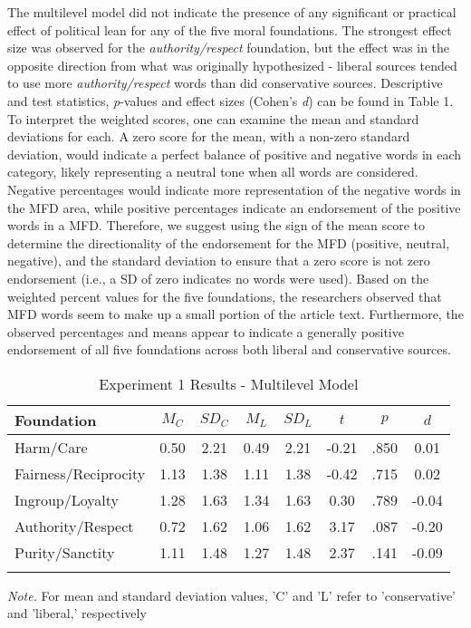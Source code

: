 \documentclass[,man]{apa6}
\begin{document}
The multilevel model did not indicate the presence of any significant or
practical effect of political lean for any of the five moral
foundations. The strongest effect size was observed for the
\emph{authority/respect} foundation, but the effect was in the opposite
direction from what was originally hypothesized - liberal sources tended
to use more \emph{authority/respect} words than did conservative
sources. Descriptive and test statistics, \emph{p}-values and effect
sizes (Cohen's \emph{d}) can be found in Table 1. To interpret the
weighted scores, one can examine the mean and standard deviations for
each. A zero score for the mean, with a non-zero standard deviation,
would indicate a perfect balance of positive and negative words in each
category, likely representing a neutral tone when all words are
considered. Negative percentages would indicate more representation of
the negative words in the MFD area, while positive percentages indicate
an endorsement of the positive words in a MFD. Therefore, we suggest
using the sign of the mean score to determine the directionality of the
endorsement for the MFD (positive, neutral, negative), and the standard
deviation to ensure that a zero score is not zero endorsement (i.e., a
SD of zero indicates no words were used). Based on the weighted percent
values for the five foundations, the researchers observed that MFD words
seem to make up a small portion of the article text. Furthermore, the
observed percentages and means appear to indicate a generally positive
endorsement of all five foundations across both liberal and conservative
sources.

\begin{table}[tbp]
\begin{center}
\begin{threeparttable}
\caption{\label{tab:exp1-table}Experiment 1 Results - Multilevel Model}
\begin{tabular}{lccccccc}
\toprule
Foundation & $M_C$ & $SD_C$ & $M_L$ & $SD_L$ & $t$ & $p$ & $d$\\
\midrule
Harm/Care & 0.50 & 2.21 & 0.49 & 2.21 & -0.21 & .850 & 0.01\\
Fairness/Reciprocity & 1.13 & 1.38 & 1.11 & 1.38 & -0.42 & .715 & 0.02\\
Ingroup/Loyalty & 1.28 & 1.63 & 1.34 & 1.63 & 0.30 & .789 & -0.04\\
Authority/Respect & 0.72 & 1.62 & 1.06 & 1.62 & 3.17 & .087 & -0.20\\
Purity/Sanctity & 1.11 & 1.48 & 1.27 & 1.48 & 2.37 & .141 & -0.09\\
\bottomrule
\addlinespace
\end{tabular}
\begin{tablenotes}[para]
\normalsize{\textit{Note.} For mean and standard deviation values, 'C' and 'L' refer to 'conservative' and 'liberal,' respectively}
\end{tablenotes}
\end{threeparttable}
\end{center}
\end{table}
\end{document}
